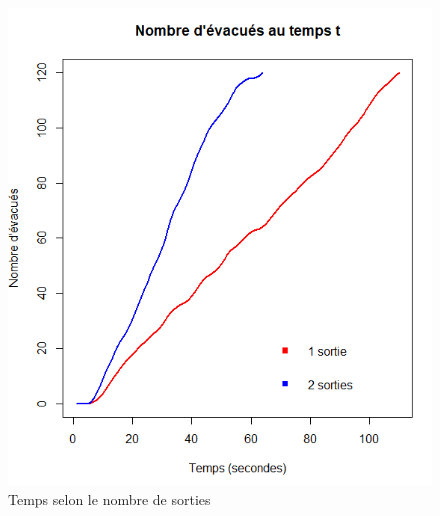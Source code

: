 \documentclass[10pt]{beamer}
\begin{document}
\begin{frame}
\begin{columns}
				\begin{figure}
				\includegraphics[width=\linewidth]{nb_sortie.PNG}
 				\caption{Temps selon le nombre de sorties}
 				\label{pic: sortie2}
 			\end{figure}
	\end{columns}
\end{frame}
\end{document}

